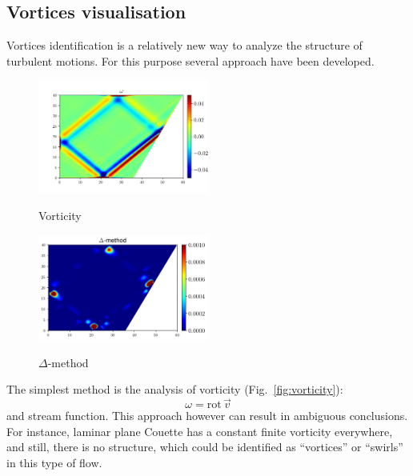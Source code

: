\documentclass[a4wide,fontsize=12pt]{article}
\begin{document}
\newpage
\subsection{Vortices visualisation}

Vortices identification is a relatively new way to analyze the structure of turbulent motions. For this purpose several approach have been developed.

\begin{figure}[H]
\begin{multicols}{2}
    \centering
    \includegraphics[width=0.5\textwidth]{Figs/VortexRot.png}
    \caption{Vorticity}
    \label{fig:vorticity}
    \hfill
    \includegraphics[width=0.5\textwidth]{Figs/VortexDelta.png}
    \caption{$\Delta$-method}
    \label{fig:Delta}
\end{multicols}
\end{figure}

The simplest method is the analysis of vorticity \cite{vortex} (Fig.~\ref{fig:vorticity}): $$\omega=\textrm{rot}\,\vec{v}$$ and stream function.
This approach however can result in ambiguous conclusions. For instance, laminar plane Couette has a constant finite vorticity everywhere, and still, there is no structure, which could be identified as ``vortices'' or ``swirls'' in this type of flow.
\end{document}
